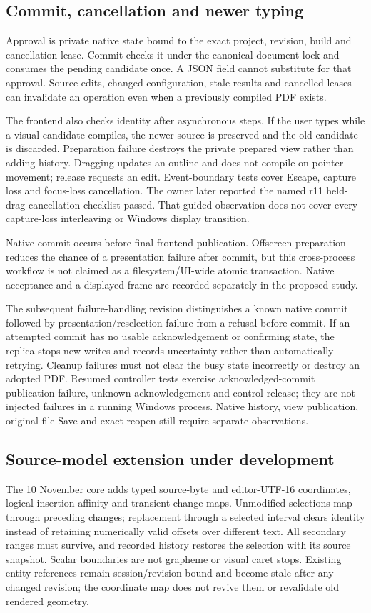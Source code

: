 \subsection{Commit, cancellation and newer typing}
Approval is private native state bound to the exact project, revision, build
and cancellation lease. Commit checks it under the canonical document lock
and consumes the pending candidate once. A JSON field cannot substitute for
that approval. Source edits, changed configuration, stale results and cancelled
leases can invalidate an operation even when a previously compiled PDF exists.

The frontend also checks identity after asynchronous steps. If the user types
while a visual candidate compiles, the newer source is preserved and the old
candidate is discarded. Preparation failure destroys the private prepared
view rather than adding history. Dragging updates an outline and does not
compile on pointer movement; release requests an edit. Event-boundary tests
cover Escape, capture loss and focus-loss cancellation. The owner later reported
the named r11 held-drag cancellation checklist passed. That guided observation
does not cover every capture-loss interleaving or Windows display transition.

Native commit occurs before final frontend publication. Offscreen preparation
reduces the chance of a presentation failure after commit, but this cross-process
workflow is not claimed as a filesystem/UI-wide atomic transaction. Native
acceptance and a displayed frame are recorded separately in the proposed study.

The subsequent failure-handling revision distinguishes a known
native commit followed by presentation/reselection failure from a refusal
before commit. If an attempted commit has no usable acknowledgement or
confirming state, the replica stops new writes and records uncertainty rather
than automatically retrying. Cleanup failures must not clear the busy state
incorrectly or destroy an adopted PDF. Resumed controller tests exercise
acknowledged-commit publication failure, unknown acknowledgement and control
release; they are not injected failures in a running Windows process. Native
history, view publication, original-file Save and exact reopen still require
separate observations.

\subsection{Source-model extension under development}
The 10 November core adds typed source-byte and editor-UTF-16 coordinates,
logical insertion affinity and transient change maps. Unmodified selections
map through preceding changes; replacement through a selected interval clears
identity instead of retaining numerically valid offsets over different text.
All secondary ranges must survive, and recorded history restores the selection
with its source snapshot. Scalar boundaries are not grapheme or visual caret
stops. Existing entity references remain session/revision-bound and become
stale after any changed revision; the coordinate map does not revive them or
revalidate old rendered geometry.

